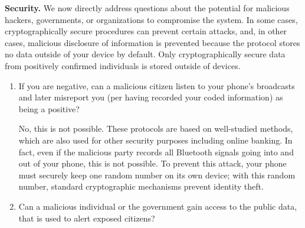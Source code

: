 \documentclass{article}
\begin{document}
\textbf{Security.} We now directly address questions about the potential for malicious hackers, governments, or organizations to compromise the system. In some cases, cryptographically secure procedures can prevent certain attacks, and, in other cases, malicious disclosure of information is prevented because the protocol stores no data outside of your device by default. Only cryptographically secure data from positively confirmed individuals is  stored outside of devices.

\begin{enumerate}[leftmargin=*]

\item If you are negative, can a malicious citizen listen to your phone's broadcasts and later misreport you (per having recorded your coded information) as being a positive?

   No, this is not possible. These protocols are based on well-studied methods, which are also used for other security purposes including online banking. In fact, even if the malicious party records all Bluetooth signals going into and out of your phone, this is not possible.   To prevent this attack, your phone must securely keep one random number on its own device; with this random number, standard cryptographic mechanisms prevent identity theft. 
   
   \iffalse 
   More centrally, recall that since you have not reported as being positive, then no information of yours will leave your phone\footnote{Technically, the Bluetooth protocol used is one where random signals are sent from your phone. However, these signals are random and reveal no information about any information on your phone, under standard  cryptographic assumptions.}.
   \fi
   
\iffalse
These protocols are based on well-studied methods, which are also used for other security purposes including online banking. In fact, even if the malicious party records all Bluetooth signals going into and out of your phone, this is not possible. To prevent this attack, your phone must securely keep one random number on its own device; with this random number, standard cryptographic mechanisms will prevent you from identity theft. 
\fi

\iffalse
\item Can a malicious individual or the government gain access to the public data, that is used to alert exposed citizens? 


\end{enumerate}
\end{document}
